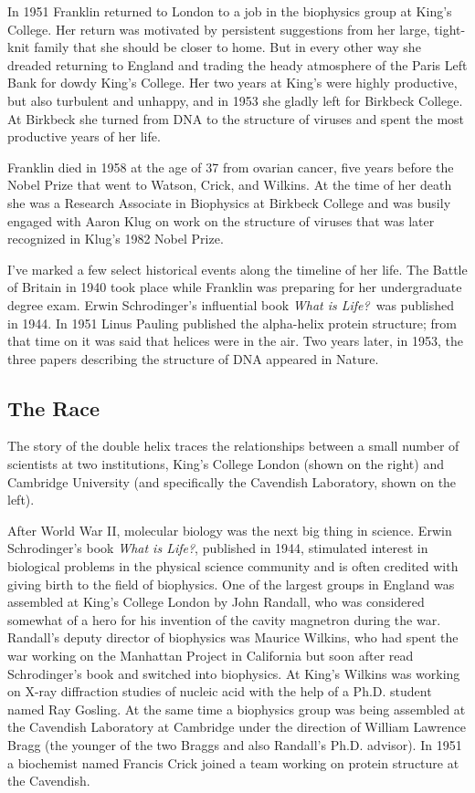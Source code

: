 \documentclass[12pt]{article}
\begin{document}
In 1951 Franklin returned to London to a job in the biophysics group at King's
College. Her return was motivated by persistent suggestions from her large,
tight-knit family that she should be closer to home.  But in every other way
she dreaded returning to England and trading the heady atmosphere of the Paris
Left Bank for dowdy King's College. Her two years at King's were highly
productive, but also turbulent and unhappy, and in 1953 she gladly left for
Birkbeck College. At Birkbeck she turned from DNA to the structure of viruses
and spent the most productive years of her life. 

Franklin died in 1958 at the age of 37 from ovarian cancer, five years before
the Nobel Prize that went to Watson, Crick, and Wilkins. At the time of her
death she was a Research Associate in Biophysics at Birkbeck College and was
busily engaged with Aaron Klug on work on the structure of viruses that was
later recognized in Klug's 1982 Nobel Prize. 

I've marked a few select historical events along the timeline of her life. The
Battle of Britain in 1940 took place while Franklin was preparing for her
undergraduate degree exam. Erwin Schrodinger's influential book
{\it What is Life?}~was published in 1944. In 1951 Linus Pauling published the alpha-helix protein
structure; from that time on it was said that helices were in the air. Two
years later, in 1953, the three papers describing the structure of DNA appeared
in Nature.

\subsection*{The Race}
The story of the double helix traces the relationships between a small number
of scientists at two institutions, King's College London (shown on the right)
and Cambridge University (and specifically the Cavendish Laboratory, shown on
the left).

After World War II, molecular biology was the next big thing in science. Erwin
Schrodinger's book {\it What is Life?}, published in 1944, stimulated interest
in biological problems in the physical science community and is often credited
with giving birth to the field of biophysics. One of the largest groups in
England was assembled at King's College London by John Randall, who was
considered somewhat of a hero for his invention of the cavity magnetron during
the war. Randall's deputy director of biophysics was Maurice Wilkins, who had
spent the war working on the Manhattan Project in California but soon after
read Schrodinger's book and switched into biophysics. At King's Wilkins was
working on X-ray diffraction studies of nucleic acid with the help of a Ph.D.
student named Ray Gosling. At the same time a biophysics group was being
assembled at the Cavendish Laboratory at Cambridge under the direction of
William Lawrence Bragg (the younger of the two Braggs and also Randall's Ph.D.
advisor). In 1951 a biochemist named Francis Crick joined a team working on
protein structure at the Cavendish.
\end{document}
